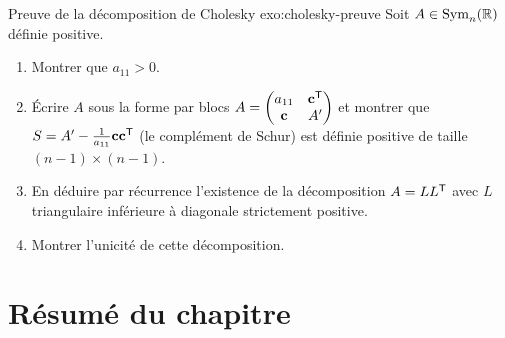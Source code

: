 \begin{exercise}{Preuve de la décomposition de Cholesky \challenging}{exo:cholesky-preuve}
  Soit $A \in \operatorname{Sym}_n({\mathbb{R}})$ définie positive.
  \begin{enumerate}[label=(\alph*)]
    \item Montrer que $a_{11} > 0$.
    \item Écrire $A$ sous la forme par blocs
      $A = \begin{pmatrix} a_{11} & {\mathbf{c}}^{\mathsf{T}} \\
      \mathbf{c} & A' \end{pmatrix}$ et montrer que
      $S = A' - \frac{1}{a_{11}} \mathbf{c}{\mathbf{c}}^{\mathsf{T}}$ (le
      complément de Schur) est définie
      positive de taille $(n-1) \times (n-1)$.
    \item En déduire par récurrence l'existence de la décomposition
      $A = L{L}^{\mathsf{T}}$ avec $L$ triangulaire inférieure à diagonale
      strictement positive.
    \item Montrer l'unicité de cette décomposition.
  \end{enumerate}
\end{exercise}

\section*{Résumé du chapitre}

